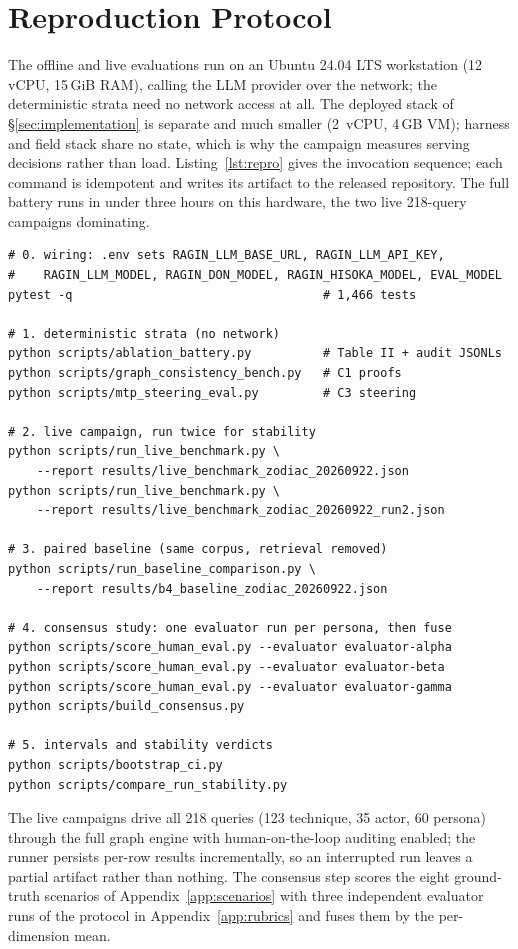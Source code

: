 \section{Reproduction Protocol}
\label{app:repro}
The offline and live evaluations run on an Ubuntu 24.04 LTS workstation
(12 vCPU, 15\,GiB RAM), calling the LLM provider over the network; the
deterministic strata need no network access at all. The deployed stack of
\S\ref{sec:implementation} is separate and much smaller (2~vCPU, 4\,GB
VM); harness and field stack share no state, which is why the campaign
measures serving decisions rather than load. Listing~\ref{lst:repro}
gives the invocation sequence; each command is idempotent and writes its
artifact to the released repository. The full battery runs in under
three hours on this hardware, the two live 218-query campaigns
dominating.

\begin{lstlisting}[style=code,float=tb,caption={Full reproduction sequence. Each step writes the artifact that backs its section.},label={lst:repro}]
# 0. wiring: .env sets RAGIN_LLM_BASE_URL, RAGIN_LLM_API_KEY,
#    RAGIN_LLM_MODEL, RAGIN_DON_MODEL, RAGIN_HISOKA_MODEL, EVAL_MODEL
pytest -q                                   # 1,466 tests

# 1. deterministic strata (no network)
python scripts/ablation_battery.py          # Table II + audit JSONLs
python scripts/graph_consistency_bench.py   # C1 proofs
python scripts/mtp_steering_eval.py         # C3 steering

# 2. live campaign, run twice for stability
python scripts/run_live_benchmark.py \
    --report results/live_benchmark_zodiac_20260922.json
python scripts/run_live_benchmark.py \
    --report results/live_benchmark_zodiac_20260922_run2.json

# 3. paired baseline (same corpus, retrieval removed)
python scripts/run_baseline_comparison.py \
    --report results/b4_baseline_zodiac_20260922.json

# 4. consensus study: one evaluator run per persona, then fuse
python scripts/score_human_eval.py --evaluator evaluator-alpha
python scripts/score_human_eval.py --evaluator evaluator-beta
python scripts/score_human_eval.py --evaluator evaluator-gamma
python scripts/build_consensus.py

# 5. intervals and stability verdicts
python scripts/bootstrap_ci.py
python scripts/compare_run_stability.py
\end{lstlisting}

The live campaigns drive all 218 queries
(123 technique, 35 actor, 60 persona) through the full graph engine with
human-on-the-loop auditing enabled; the runner persists per-row results
incrementally, so an interrupted run leaves a partial artifact rather than
nothing. The consensus step scores the eight ground-truth scenarios of
Appendix~\ref{app:scenarios} with three independent evaluator runs of the
protocol in Appendix~\ref{app:rubrics} and fuses them by the per-dimension mean.

